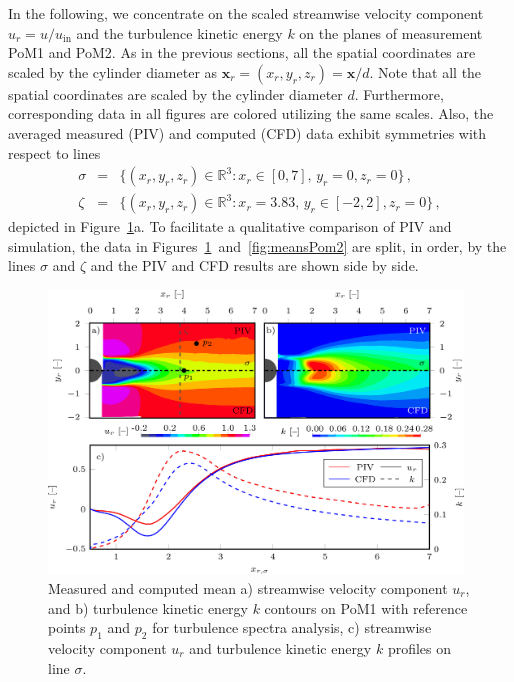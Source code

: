 In the following, we concentrate on the scaled streamwise velocity component $u_r=u/u_{\mathrm{in}}$ and the turbulence kinetic energy $k$ on the planes of measurement PoM1 and PoM2. As in the previous sections, all the spatial coordinates are scaled by the cylinder diameter as $\bm{x}_{r} = (x_{r},y_{r},z_{r}) = \bm{x}/d$. Note that all the spatial coordinates are scaled by the cylinder diameter $d$. Furthermore, corresponding data in all figures are colored utilizing the same scales. {Also, the} {averaged} measured (PIV) and computed (CFD) {data exhibit symmetries with respect to lines}
\begin{equation}
\label{eq:sigmaZeta}
    \begin{array}{rcl}
        \displaystyle \sigma &=& \displaystyle \{(x_{r},y_{r},z_{r})\in\mathbb{R}^{3}:x_{r}\in [0,7],\,y_{r} = 0,z_{r}=0\}\,,\\[0.2cm]
        \displaystyle \zeta  &=& \displaystyle \{(x_{r},y_{r},z_{r})\in\mathbb{R}^{3}:x_{r} = 3.83,\,y_{r}\in [-2,2],z_{r}=0\}\,,
    \end{array}
\end{equation}
depicted in Figure~\ref{fig:meansPom1}a. {To facilitate a qualitative comparison of PIV and simulation, the data in Figures~\ref{fig:meansPom1}~and~\ref{fig:meansPom2} are split, in order, by the lines $\sigma$ and $\zeta$ and the PIV and CFD results are shown side by side.}

\begin{figure}[htbp]
    \includegraphics[width=0.98\textwidth]{02_images/00_export/figure5.png}
    \caption{Measured and computed mean a) streamwise velocity component $u_r$, and b) turbulence kinetic energy $k$ contours on PoM1 with reference points $p_{1}$ and $p_{2}$ for turbulence spectra analysis, c) streamwise velocity component $u_r$ and turbulence kinetic energy $k$ profiles on line $\sigma$.}
    \label{fig:meansPom1}
\end{figure}

